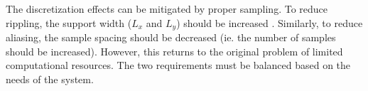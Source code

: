 The discretization effects can be mitigated by proper sampling. To reduce rippling, the support width ($L_x$ and $L_y$) should be increased \cite{NSOWP}.  Similarly, to reduce aliasing, the sample spacing should be decreased (ie. the number of samples should be increased).  However, this returns to the original problem of limited computational resources.  The two requirements must be balanced based on the needs of the system.  




